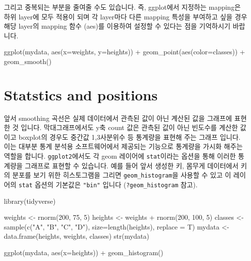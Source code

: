 \documentclass[
]{book}
\newenvironment{Shaded}{\begin{snugshade}}{\end{snugshade}}
\newcommand{\AttributeTok}[1]{\textcolor[rgb]{0.77,0.63,0.00}{#1}}
\newcommand{\DecValTok}[1]{\textcolor[rgb]{0.00,0.00,0.81}{#1}}
\newcommand{\FunctionTok}[1]{\textcolor[rgb]{0.00,0.00,0.00}{#1}}
\newcommand{\NormalTok}[1]{#1}
\newcommand{\OtherTok}[1]{\textcolor[rgb]{0.56,0.35,0.01}{#1}}
\newcommand{\SpecialCharTok}[1]{\textcolor[rgb]{0.00,0.00,0.00}{#1}}
\newcommand{\StringTok}[1]{\textcolor[rgb]{0.31,0.60,0.02}{#1}}
\begin{document}
그리고 중복되는 부분을 줄여줄 수도 있습니다. 즉, ggplot에서 지정하는 mapping은 하위 layer에 모두 적용이 되며 각 layer마다 다른 mapping 특성을 부여하고 싶을 경우 해당 layer의 mapping 함수 (aes)를 이용하여 설정할 수 있다는 점을 기억하시기 바랍니다.

\begin{Shaded}
\begin{Highlighting}[]
\FunctionTok{ggplot}\NormalTok{(mydata, }\FunctionTok{aes}\NormalTok{(}\AttributeTok{x=}\NormalTok{weights, }\AttributeTok{y=}\NormalTok{heights)) }\SpecialCharTok{+}
  \FunctionTok{geom\_point}\NormalTok{(}\FunctionTok{aes}\NormalTok{(}\AttributeTok{color=}\NormalTok{classes)) }\SpecialCharTok{+}
  \FunctionTok{geom\_smooth}\NormalTok{()}
\end{Highlighting}
\end{Shaded}

\hypertarget{statstics-and-positions}{%
\section{Statstics and positions}\label{statstics-and-positions}}

앞서 smoothing 곡선은 실제 데이터에서 관측된 값이 아닌 계산된 값을 그래프에 표현한 것 입니다. 막대그래프에서도 y축 count 값은 관측된 값이 아닌 빈도수를 계산한 값이고 boxplot의 경우도 중간값 1,3사분위수 등 통계량을 표현해 주는 그래프 입니다. 이는 대부분 통계 분석용 소프트웨어에서 제공되는 기능으로 통계량을 가시화 해주는 역할을 합니다. \texttt{ggplot2}에서도 각 geom 레이어에 \texttt{stat}이라는 옵션을 통해 이러한 통계량을 그래프로 표현할 수 있습니다. 예를 들어 앞서 생성한 키, 몸무게 데이터에서 키의 분포를 보기 위한 히스토그램을 그리면 \texttt{geom\_histogram}을 사용할 수 있고 이 레이어의 \texttt{stat} 옵션의 기본값은 \texttt{"bin"} 입니다 (\texttt{?geom\_histogram} 참고).

\begin{Shaded}
\begin{Highlighting}[]
\FunctionTok{library}\NormalTok{(tidyverse)}

\NormalTok{weights }\OtherTok{\textless{}{-}} \FunctionTok{rnorm}\NormalTok{(}\DecValTok{200}\NormalTok{, }\DecValTok{75}\NormalTok{, }\DecValTok{5}\NormalTok{)}
\NormalTok{heights }\OtherTok{\textless{}{-}}\NormalTok{ weights }\SpecialCharTok{+} \FunctionTok{rnorm}\NormalTok{(}\DecValTok{200}\NormalTok{, }\DecValTok{100}\NormalTok{, }\DecValTok{5}\NormalTok{)}
\NormalTok{classes }\OtherTok{\textless{}{-}} \FunctionTok{sample}\NormalTok{(}\FunctionTok{c}\NormalTok{(}\StringTok{"A"}\NormalTok{, }\StringTok{"B"}\NormalTok{, }\StringTok{"C"}\NormalTok{, }\StringTok{"D"}\NormalTok{), }\AttributeTok{size=}\FunctionTok{length}\NormalTok{(heights), }\AttributeTok{replace =}\NormalTok{ T)}
\NormalTok{mydata }\OtherTok{\textless{}{-}} \FunctionTok{data.frame}\NormalTok{(heights, weights, classes)}
\FunctionTok{str}\NormalTok{(mydata)}

\FunctionTok{ggplot}\NormalTok{(mydata, }\FunctionTok{aes}\NormalTok{(}\AttributeTok{x=}\NormalTok{heights)) }\SpecialCharTok{+}
  \FunctionTok{geom\_histogram}\NormalTok{()}
\end{Highlighting}
\end{Shaded}
\end{document}
